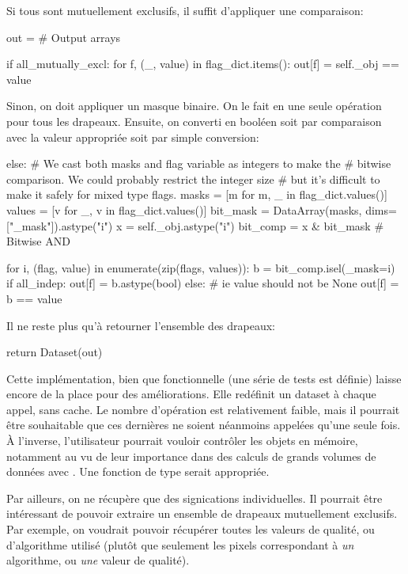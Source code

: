 Si tous sont mutuellement exclusifs, il suffit d'appliquer une comparaison:
\begin{pythonMiddle}[]
    out = {}  # Output arrays

    if all_mutually_excl:
        for f, (_, value) in flag_dict.items():
            out[f] = self._obj == value
\end{pythonMiddle}

Sinon, on doit appliquer un masque binaire. On le fait en une seule opération pour tous les drapeaux.
Ensuite, on converti en booléen soit par comparaison avec la valeur appropriée soit par simple conversion:
\begin{pythonMiddle}[]
    else:
        # We cast both masks and flag variable as integers to make the
        # bitwise comparison. We could probably restrict the integer size
        # but it's difficult to make it safely for mixed type flags.
        masks = [m for m, _ in flag_dict.values()]
        values = [v for _, v in flag_dict.values()]
        bit_mask = DataArray(masks, dims=["_mask"]).astype("i")
        x = self._obj.astype("i")
        bit_comp = x & bit_mask  # Bitwise AND

        for i, (flag, value) in enumerate(zip(flags, values)):
            b = bit_comp.isel(_mask=i)
            if all_indep:
                out[f] = b.astype(bool)
            else:  # ie value should not be None
                out[f] = b == value
\end{pythonMiddle}

Il ne reste plus qu'à retourner l'ensemble des drapeaux:
\begin{pythonLast}[]
    return Dataset(out)
\end{pythonLast}

Cette implémentation, bien que fonctionnelle (une série de tests est définie) laisse encore de la place pour des améliorations.
Elle redéfinit un dataset à chaque appel, sans cache. Le nombre d'opération est relativement faible, mais il pourrait être souhaitable que ces dernières ne soient néanmoins appelées qu'une seule fois.
À l'inverse, l'utilisateur pourrait vouloir contrôler les objets en mémoire, notamment au vu de leur importance dans des calculs de grands volumes de données avec . Une fonction de type  serait appropriée.

Par ailleurs, on ne récupère que des signications individuelles. Il pourrait être intéressant de pouvoir extraire un ensemble de drapeaux mutuellement exclusifs.
Par exemple, on voudrait pouvoir récupérer toutes les valeurs de qualité, ou d'algorithme utilisé (plutôt que seulement les pixels correspondant à \emph{un} algorithme, ou \emph{une} valeur de qualité).

